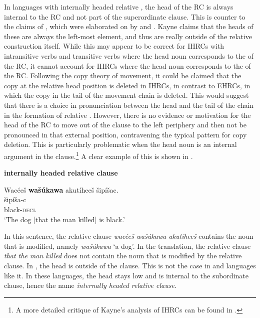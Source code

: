 \documentclass[output=paper]{LSP/langsci}
\begin{document}
In languages with internally headed relative , the head of the RC is always internal to the RC and not part of the superordinate clause. This is counter to the claims of \citet{Kayne1994}, which were elaborated on by \citet{Bianchi1999} and \citet{DiSciullo2005}. Kayne claims that the heads of these  are always the left-most element, and thus are really outside of the relative construction itself.  While this may appear to be correct for IHRCs with intransitive verbs and transitive verbs where the head noun corresponds to the  of the RC, it cannot account for IHRCs where the head noun corresponds to the  of the RC. Following the copy theory of movement, it could be claimed that the copy at the relative head position is deleted in IHRCs, in contrast to EHRCs, in which the copy in the tail of the movement chain is deleted. This would suggest that there is a choice in pronunciation between the head and the tail of the chain in the formation of relative . However, there is no evidence or motivation for the head of the RC to move out of the clause to the left periphery and then not be pronounced in that external position, contravening the typical pattern for copy deletion. This is particularly problematic when the head noun is an internal argument in the clause.\footnote{A more detailed critique of Kayne's analysis of IHRCs can be found in \citet{Boyle2007}.}  A clear example of this is shown in .

\ea \textbf{ internally headed relative clause} \label{boyle11}

\glll {\ob}Wac\'ee\v{s} \textbf{wa\v{s}\'ukawa} akut\'ihee\v{s}{\cb} \v{s}ip\'i\v{s}ac.\\
[wac\'ee-\v{s}    \textbf{wa\v{s}\'uka-wa}  aku-t\'i-hee-\v{s}]  \v{s}ip\'i\v{s}a-c\\
[man-\textsc{det.d} \textbf{dog-\textsc{det.i}}  \textsc{rel.s}-die-\textsc{3.caus.d.sg}-\textsc{det.d}] black-\textsc{decl}\\
\trans `The dog [that the man killed] is black.' 
\z

In this sentence, the relative clause \textit{wac\'ee\v{s} wa\v{s}\'ukawa akut\'ihee\v{s}} contains the noun that is modified, namely \textit{wa\v{s}\'ukawa} `a dog'. In the  translation, the relative clause \textit{that the man killed} does not contain the noun that is modified by the relative clause. In , the head is outside of the clause. This is not the case in  and languages like it.  In these languages, the head stays low and is internal to the subordinate clause, hence the name \textit{internally headed relative clause}.
	
\end{document}
